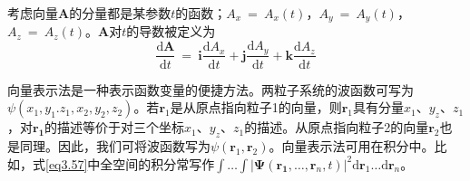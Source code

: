 \documentclass[12pt,a4paper,openany]{ctexbook}
\newcommand{\abs}[1]{\left| #1 \right|}
\newcommand{\bp}{\bm{\Psi}}
\newcommand{\dd}[1]{\mathrm{d} #1}
\begin{document}
\begin{flushleft}
考虑向量$\boldsymbol{A}$的分量都是某参数$t$的函数；$A_x\ =\ A_x(t)$，$A_y\ =\ A_y(t)$，$A_z\ =\ A_z(t)$。$\boldsymbol{A}$对$t$的导数被定义为
\begin{equation}
    \frac{\dd \boldsymbol{A}}{\dd t}\ =\ \boldsymbol{i}\frac{\dd A_x}{\dd t}+\boldsymbol{j}\frac{\dd A_y}{\dd t}+\boldsymbol{k}\frac{\dd A_z}{\dd t} \label{eq5.32}
\end{equation}

向量表示法是一种表示函数变量的便捷方法。两粒子系统的波函数可写为$\psi(x_1,y_1.z_1,x_2,y_2,z_2)$。若$\boldsymbol{r}_1$是从原点指向粒子1的向量，则$\boldsymbol{r}_1$具有分量$x_1$、$y_z$、$z_1$，对$\boldsymbol{r_1}$的描述等价于对三个坐标$x_1$、$y_z$、$z_1$的描述。从原点指向粒子2的向量$\boldsymbol{r}_2$也是同理。因此，我们可将波函数写为$\psi(\boldsymbol{r}_1,\boldsymbol{r}_2)$。向量表示法可用在积分中。比如，式\eqref{eq3.57}中全空间的积分常写作$\int\dots\int\abs{\bp(\boldsymbol{r_1},\dots,\boldsymbol{r}_n,t)}^2\dd\boldsymbol{r}_1\dots\dd\boldsymbol{r}_n$。
\end{flushleft}
\end{document}
